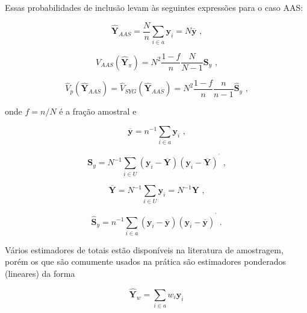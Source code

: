 \documentclass[]{book}
\theoremstyle{definition}
\theoremstyle{definition}
\theoremstyle{definition}
\theoremstyle{remark}
\begin{document}
Essas probabilidades de inclusão levam às seguintes expressões para o
caso AAS:

\begin{equation}
\hat{\mathbf{Y}}_{AAS} = \frac{N}{n} \sum_{i \in a} \mathbf{y}_i = N \overline{\mathbf{y}} \mbox{ ,}  \label{eq:estpa7}
\end{equation}

\begin{equation}
V_{AAS} \left( \mathbf{\hat{Y}}_{\pi} \right) = N^{2} \frac{1-f}{n} \frac{N}{N-1}
\mathbf{S}_y \mbox{ ,}  \label{eq:estpa8}
\end{equation}

\begin{equation}
\hat{V}_p \left( \mathbf{\hat{Y}}_{AAS} \right) = \hat{V}_{SYG} \left( 
\mathbf{\hat{Y}}_{AAS} \right) = N^{2} \frac{1-f}{n} \frac{n}{n-1} \mathbf{\hat{S}}_y \mbox{ ,} \label{eq:estpa9}
\end{equation}

onde \(f=n/N\) é a fração amostral e

\begin{equation}
\overline{\mathbf{y}} = n^{-1} \sum_{i \in a} \mathbf{y}_i \mbox{ ,} \label{eq:estpa10}
\end{equation}

\begin{equation}
\mathbf{S}_y = N^{-1} \sum_{i \in U} \left( \mathbf{y}_i - \overline{\mathbf{Y}}
\right) \left( \mathbf{y}_i - \overline{\mathbf{Y}} \right) ^{^{\prime }} \mbox{ ,}  \label{eq:estpa11}
\end{equation}

\begin{equation}
\overline{\mathbf{Y}} = N^{-1} \sum_{i \in U} \mathbf{y}_i = N^{-1} \mathbf{Y} \mbox{ ,}  \label{eq:estpa12}
\end{equation}

\begin{equation}
\widehat{\mathbf{S}}_y = n^{-1} \sum_{i \in a} \left( \mathbf{y}_i - \overline{\mathbf{y}} \right) \left( \mathbf{y}_i - \overline{\mathbf{y}} \right) ^{^{\prime }} \;. \label{eq:estpa13} 
\end{equation}

Vários estimadores de totais estão disponíveis na literatura de
amostragem, porém os que são comumente usados na prática são estimadores
ponderados (lineares) da forma

\begin{equation}
\mathbf{\hat{Y}}_w = \sum\limits_{i \in a} w_i \mathbf{y}_i  \label{eq:estpa14}
\end{equation}
\end{document}
